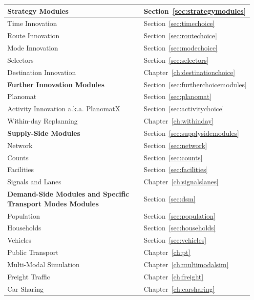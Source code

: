 
\begin{table}
\caption{Modules}
\label{tab:modules}
\begin{longtable}[c]{|l|l|}
	\hline
	\textbf{Strategy Modules} & Section~\ref{sec:strategymodules} \\
	\hline
	Time Innovation & Section~\ref{sec:timechoice} \\
	Route Innovation & Section~\ref{sec:routechoice} \\
	Mode Innovation & Section~\ref{sec:modechoice} \\
	Selectors & Section~\ref{sec:selectors} \\
	Destination Innovation & Chapter~\ref{ch:destinationchoice} \\
	\hline
	\hline
	\textbf{Further Innovation Modules} & Section~\ref{sec:furtherchoicemodules} \\
	\hline
	Planomat & Section~\ref{sec:planomat} \\
	Activity Innovation a.k.a. PlanomatX & Section~\ref{sec:activitychoice} \\
	Within-day Replanning & Chapter~\ref{ch:withinday} \\
	\hline
	\hline
	\textbf{Supply-Side Modules} & Section~\ref{sec:supplysidemodules} \\
	\hline
	Network & Section~\ref{sec:network} \\
	Counts & Section~\ref{sec:counts} \\
	Facilities & Section~\ref{sec:facilities} \\
	Signals and Lanes & Chapter~\ref{ch:signalslanes} \\
	\hline
	\hline
	\textbf{Demand-Side Modules and Specific Transport Modes Modules} & Section~\ref{sec:dsm} \\
	\hline
	Population & Section~\ref{sec:population} \\
	Households & Section~\ref{sec:households} \\
	Vehicles & Section~\ref{sec:vehicles} \\
	Public Transport & Chapter~\ref{ch:pt} \\
	Multi-Modal Simulation & Chapter~\ref{ch:multimodalsim} \\
	Freight Traffic & Chapter~\ref{ch:freight} \\
	Car Sharing & Chapter~\ref{ch:carsharing} \\

\end{longtable}
\end{table}
